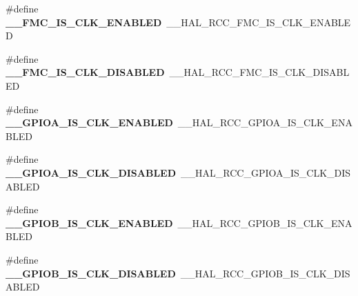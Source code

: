 \begin{DoxyCompactItemize}
\item 
\#define {\bfseries \+\_\+\+\_\+\+F\+M\+C\+\_\+\+I\+S\+\_\+\+C\+L\+K\+\_\+\+E\+N\+A\+B\+L\+ED}~\+\_\+\+\_\+\+H\+A\+L\+\_\+\+R\+C\+C\+\_\+\+F\+M\+C\+\_\+\+I\+S\+\_\+\+C\+L\+K\+\_\+\+E\+N\+A\+B\+L\+ED\hypertarget{group___h_a_l___r_c_c___aliased_gaefae2949238ac20c67f33302c39bc53e}{}\label{group___h_a_l___r_c_c___aliased_gaefae2949238ac20c67f33302c39bc53e}

\item 
\#define {\bfseries \+\_\+\+\_\+\+F\+M\+C\+\_\+\+I\+S\+\_\+\+C\+L\+K\+\_\+\+D\+I\+S\+A\+B\+L\+ED}~\+\_\+\+\_\+\+H\+A\+L\+\_\+\+R\+C\+C\+\_\+\+F\+M\+C\+\_\+\+I\+S\+\_\+\+C\+L\+K\+\_\+\+D\+I\+S\+A\+B\+L\+ED\hypertarget{group___h_a_l___r_c_c___aliased_gab4d825237a2dcaa1179a16c49ece626c}{}\label{group___h_a_l___r_c_c___aliased_gab4d825237a2dcaa1179a16c49ece626c}

\item 
\#define {\bfseries \+\_\+\+\_\+\+G\+P\+I\+O\+A\+\_\+\+I\+S\+\_\+\+C\+L\+K\+\_\+\+E\+N\+A\+B\+L\+ED}~\+\_\+\+\_\+\+H\+A\+L\+\_\+\+R\+C\+C\+\_\+\+G\+P\+I\+O\+A\+\_\+\+I\+S\+\_\+\+C\+L\+K\+\_\+\+E\+N\+A\+B\+L\+ED\hypertarget{group___h_a_l___r_c_c___aliased_gae1b665ed35a5cbc7919caa954c030fc7}{}\label{group___h_a_l___r_c_c___aliased_gae1b665ed35a5cbc7919caa954c030fc7}

\item 
\#define {\bfseries \+\_\+\+\_\+\+G\+P\+I\+O\+A\+\_\+\+I\+S\+\_\+\+C\+L\+K\+\_\+\+D\+I\+S\+A\+B\+L\+ED}~\+\_\+\+\_\+\+H\+A\+L\+\_\+\+R\+C\+C\+\_\+\+G\+P\+I\+O\+A\+\_\+\+I\+S\+\_\+\+C\+L\+K\+\_\+\+D\+I\+S\+A\+B\+L\+ED\hypertarget{group___h_a_l___r_c_c___aliased_gadaaf5188daab606033dfa7736771f391}{}\label{group___h_a_l___r_c_c___aliased_gadaaf5188daab606033dfa7736771f391}

\item 
\#define {\bfseries \+\_\+\+\_\+\+G\+P\+I\+O\+B\+\_\+\+I\+S\+\_\+\+C\+L\+K\+\_\+\+E\+N\+A\+B\+L\+ED}~\+\_\+\+\_\+\+H\+A\+L\+\_\+\+R\+C\+C\+\_\+\+G\+P\+I\+O\+B\+\_\+\+I\+S\+\_\+\+C\+L\+K\+\_\+\+E\+N\+A\+B\+L\+ED\hypertarget{group___h_a_l___r_c_c___aliased_gaf50fd46c52bbb4387130ade81a66638b}{}\label{group___h_a_l___r_c_c___aliased_gaf50fd46c52bbb4387130ade81a66638b}

\item 
\#define {\bfseries \+\_\+\+\_\+\+G\+P\+I\+O\+B\+\_\+\+I\+S\+\_\+\+C\+L\+K\+\_\+\+D\+I\+S\+A\+B\+L\+ED}~\+\_\+\+\_\+\+H\+A\+L\+\_\+\+R\+C\+C\+\_\+\+G\+P\+I\+O\+B\+\_\+\+I\+S\+\_\+\+C\+L\+K\+\_\+\+D\+I\+S\+A\+B\+L\+ED\hypertarget{group___h_a_l___r_c_c___aliased_ga72a13fc60ce82c923f9c005b17a45fe0}{}\label{group___h_a_l___r_c_c___aliased_ga72a13fc60ce82c923f9c005b17a45fe0}


\end{DoxyCompactItemize}
